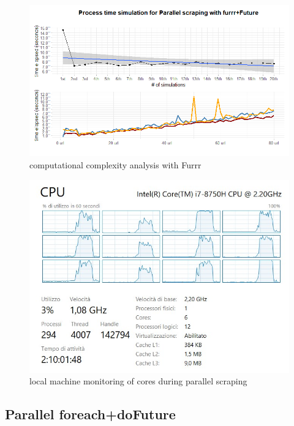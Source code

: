 \documentclass[
  12pt,
  a4paper,
  oneside]{book}
\theoremstyle{definition}
\theoremstyle{definition}
\theoremstyle{definition}
\theoremstyle{remark}
\begin{document}
\begin{figure}
\centering
\includegraphics{images/simulations/final_furrr_future.png}
\caption{\label{fig:furrrfuture}computational complexity analysis with Furrr}
\end{figure}

\begin{figure}
\centering
\includegraphics{images/parallel_computing.jpg}
\caption{\label{fig:cpumonitor}local machine monitoring of cores during parallel scraping}
\end{figure}

\hypertarget{parallel-foreachdofuture}{%
\subsection{Parallel foreach+doFuture}\label{parallel-foreachdofuture}}
\end{document}

